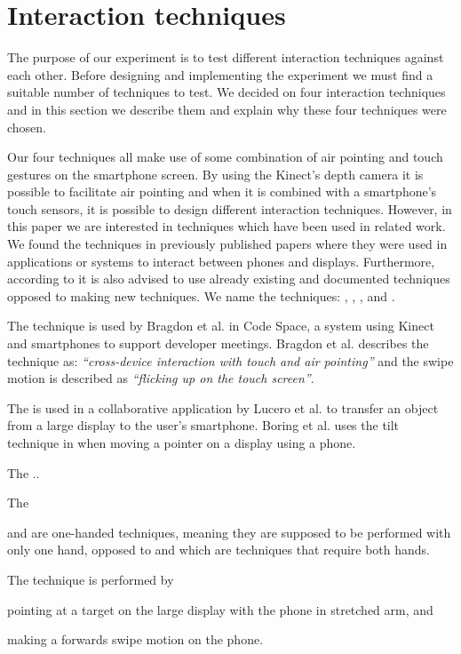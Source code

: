 \section{Interaction techniques}
The purpose of our experiment is to test different interaction techniques against each other.
Before designing and implementing the experiment we must find a suitable number of techniques to test. 
We decided on four interaction techniques and in this section we describe them and explain why these four techniques were chosen.

Our four techniques all make use of some combination of air pointing and touch gestures on the smartphone screen.
By using the Kinect's depth camera it is possible to facilitate air pointing and when it is combined with a smartphone's touch sensors, it is possible to design different interaction techniques.
However, in this paper we are interested in techniques which have been used in related work. 
We found the techniques in previously published papers where they were used in applications or systems to interact between phones and displays. 
Furthermore, according to  it is also advised to use already existing and documented techniques opposed to making new techniques. 
We name the techniques: \swipe, \tilt, \throw, and \pinch.

The \swipe technique is used by Bragdon et al. \cite{Bragdon:2011} in Code Space, a system using Kinect and smartphones to support developer meetings. 
Bragdon et al. describes the technique as: \emph{``cross-device interaction with touch and air pointing''} and the swipe motion is described as \emph{``flicking up on the touch screen''}. 

The \tilt is used in a collaborative application by Lucero et al. \cite{Lucero:2012} to transfer an object from a large display to the user's smartphone.
Boring et al. uses the tilt technique in \cite{Boring:2009} when moving a pointer on a display using a phone.

The \throw ..

The \pinch

\swipe and \tilt are one-handed techniques, meaning they are supposed to be performed with only one hand, opposed to \throw and \pinch which are techniques that require both hands.

The \swipe technique is performed by 
\begin{enumerate*}[label=\itshape\arabic*\upshape)]
	\item{pointing at a target on the large display with the phone in stretched arm, and}
	\item{making a forwards swipe motion on the phone.}
\end{enumerate*}

